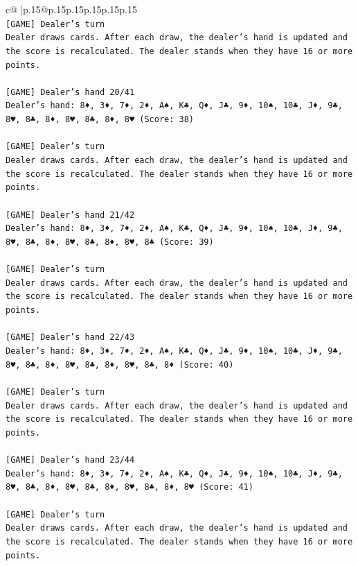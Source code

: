\documentclass{article}
\begin{document}
{\begin{supertabular}{c@{$\;$}|p{.15\linewidth}@{}p{.15\linewidth}p{.15\linewidth}p{.15\linewidth}p{.15\linewidth}p{.15\linewidth}}
{{{\\ 
\texttt{{[}GAME{]} Dealer's turn} \\
\texttt{Dealer draws cards. After each draw, the dealer's hand is updated and the score is recalculated. The dealer stands when they have 16 or more points.} \\
\\ 
\texttt{{[}GAME{]} Dealer's hand 20/41} \\
\texttt{Dealer's hand: 8♦, 3♦, 7♦, 2♦, A♠, K♣, Q♦, J♣, 9♦, 10♠, 10♣, J♦, 9♣, 8♥, 8♣, 8♦, 8♥, 8♣, 8♦, 8♥ (Score: 38)} \\
\\ 
\texttt{{[}GAME{]} Dealer's turn} \\
\texttt{Dealer draws cards. After each draw, the dealer's hand is updated and the score is recalculated. The dealer stands when they have 16 or more points.} \\
\\ 
\texttt{{[}GAME{]} Dealer's hand 21/42} \\
\texttt{Dealer's hand: 8♦, 3♦, 7♦, 2♦, A♠, K♣, Q♦, J♣, 9♦, 10♠, 10♣, J♦, 9♣, 8♥, 8♣, 8♦, 8♥, 8♣, 8♦, 8♥, 8♣ (Score: 39)} \\
\\ 
\texttt{{[}GAME{]} Dealer's turn} \\
\texttt{Dealer draws cards. After each draw, the dealer's hand is updated and the score is recalculated. The dealer stands when they have 16 or more points.} \\
\\ 
\texttt{{[}GAME{]} Dealer's hand 22/43} \\
\texttt{Dealer's hand: 8♦, 3♦, 7♦, 2♦, A♠, K♣, Q♦, J♣, 9♦, 10♠, 10♣, J♦, 9♣, 8♥, 8♣, 8♦, 8♥, 8♣, 8♦, 8♥, 8♣, 8♦ (Score: 40)} \\
\\ 
\texttt{{[}GAME{]} Dealer's turn} \\
\texttt{Dealer draws cards. After each draw, the dealer's hand is updated and the score is recalculated. The dealer stands when they have 16 or more points.} \\
\\ 
\texttt{{[}GAME{]} Dealer's hand 23/44} \\
\texttt{Dealer's hand: 8♦, 3♦, 7♦, 2♦, A♠, K♣, Q♦, J♣, 9♦, 10♠, 10♣, J♦, 9♣, 8♥, 8♣, 8♦, 8♥, 8♣, 8♦, 8♥, 8♣, 8♦, 8♥ (Score: 41)} \\
\\ 
\texttt{{[}GAME{]} Dealer's turn} \\
\texttt{Dealer draws cards. After each draw, the dealer's hand is updated and the score is recalculated. The dealer stands when they have 16 or more points.} \\
}}}
\end{supertabular}}
\end{document}
